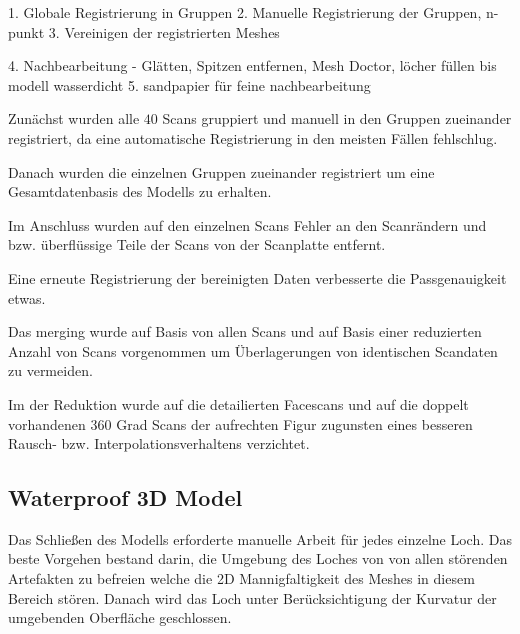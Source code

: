 \documentclass[]{article}
\begin{document}
1. Globale Registrierung in Gruppen
2. Manuelle Registrierung der Gruppen, n-punkt
3. Vereinigen der registrierten Meshes

4. Nachbearbeitung
- Glätten, Spitzen entfernen, Mesh Doctor, löcher füllen
bis modell wasserdicht
5. sandpapier für feine nachbearbeitung


Zunächst wurden alle $40$ Scans gruppiert und manuell in den Gruppen zueinander registriert, da eine automatische Registrierung in den meisten Fällen fehlschlug.

Danach wurden die einzelnen Gruppen zueinander registriert um eine Gesamtdatenbasis des Modells zu erhalten.

Im Anschluss wurden auf den einzelnen Scans Fehler an den Scanrändern und bzw. überflüssige Teile der Scans von der Scanplatte entfernt.

Eine erneute Registrierung der bereinigten Daten verbesserte die Passgenauigkeit etwas. 

Das merging wurde auf Basis von allen Scans und auf Basis einer reduzierten Anzahl von Scans vorgenommen um Überlagerungen von identischen Scandaten zu vermeiden.

Im der Reduktion wurde auf die detailierten Facescans und auf die doppelt vorhandenen 360 Grad Scans der aufrechten Figur zugunsten eines besseren Rausch- bzw. Interpolationsverhaltens verzichtet.

\subsection{Waterproof 3D Model}

Das Schließen des Modells erforderte manuelle Arbeit für jedes einzelne Loch. Das beste Vorgehen bestand darin, die Umgebung des Loches von von allen störenden Artefakten zu befreien welche die 2D Mannigfaltigkeit des Meshes in diesem Bereich stören. Danach wird das Loch unter Berücksichtigung der Kurvatur der umgebenden Oberfläche geschlossen.

\subsection{}
\subsection{}
\subsection{}
\end{document}
